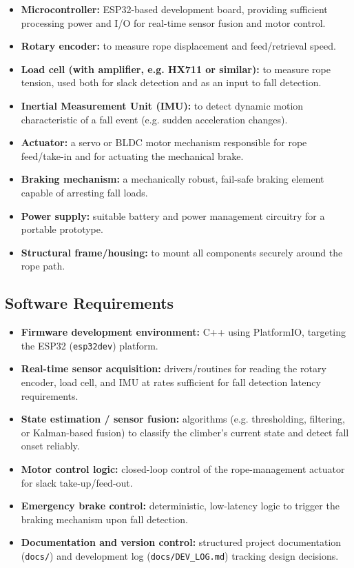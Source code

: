 \documentclass[11pt, a4paper]{article}
\begin{document}
\begin{itemize}[leftmargin=1.2cm]
    \item \textbf{Microcontroller:} ESP32-based development board,
        providing sufficient processing power and I/O for real-time
        sensor fusion and motor control.
    \item \textbf{Rotary encoder:} to measure rope displacement and
        feed/retrieval speed.
    \item \textbf{Load cell (with amplifier, e.g. HX711 or similar):} to
        measure rope tension, used both for slack detection and as an
        input to fall detection.
    \item \textbf{Inertial Measurement Unit (IMU):} to detect dynamic
        motion characteristic of a fall event (e.g. sudden acceleration
        changes).
    \item \textbf{Actuator:} a servo or BLDC motor mechanism responsible
        for rope feed/take-in and for actuating the mechanical brake.
    \item \textbf{Braking mechanism:} a mechanically robust, fail-safe
        braking element capable of arresting fall loads.
    \item \textbf{Power supply:} suitable battery and power management
        circuitry for a portable prototype.
    \item \textbf{Structural frame/housing:} to mount all components
        securely around the rope path.
\end{itemize}

\subsection{Software Requirements}

\begin{itemize}[leftmargin=1.2cm]
    \item \textbf{Firmware development environment:} C++ using
        PlatformIO, targeting the ESP32 (\texttt{esp32dev}) platform.
    \item \textbf{Real-time sensor acquisition:} drivers/routines for
        reading the rotary encoder, load cell, and IMU at rates
        sufficient for fall detection latency requirements.
    \item \textbf{State estimation / sensor fusion:} algorithms (e.g.
        thresholding, filtering, or Kalman-based fusion) to classify the
        climber's current state and detect fall onset reliably.
    \item \textbf{Motor control logic:} closed-loop control of the
        rope-management actuator for slack take-up/feed-out.
    \item \textbf{Emergency brake control:} deterministic, low-latency
        logic to trigger the braking mechanism upon fall detection.
    \item \textbf{Documentation and version control:} structured project
        documentation (\texttt{docs/}) and development log
        (\texttt{docs/DEV\_LOG.md}) tracking design decisions.
\end{itemize}
\end{document}
